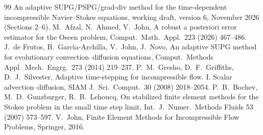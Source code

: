 \documentclass[11pt,a4paper]{article}
\begin{document}
\begin{thebibliography}{99}
 An adaptive SUPG/PSPG/grad-div method for the time-dependent incompressible Navier--Stokes equations,
working draft, version 6, November 2026 (Sections 2--6).
 M.~Afzal, N.~Ahmed, V.~John, A robust a posteriori error estimator for the Oseen problem, Comput.\ Math.\ Appl.\ 223 (2026) 467--486.
 J.~de Frutos, B.~Garc\'{\i}a-Archilla, V.~John, J.~Novo, An adaptive SUPG method for evolutionary convection--diffusion equations, Comput.\ Methods Appl.\ Mech.\ Engrg.\ 273 (2014) 219--237.
 P.~M.~Gresho, D.~F.~Griffiths, D.~J.~Silvester, Adaptive time-stepping for incompressible flow. I. Scalar advection--diffusion, SIAM J.\ Sci.\ Comput.\ 30 (2008) 2018--2054.
 P.~B.~Bochev, M.~D.~Gunzburger, R.~B.~Lehoucq, On stabilized finite element methods for the Stokes problem in the small time step limit, Int.\ J.\ Numer.\ Methods Fluids 53 (2007) 573--597.
 V.~John, Finite Element Methods for Incompressible Flow Problems, Springer, 2016.
\end{thebibliography}
\end{document}
